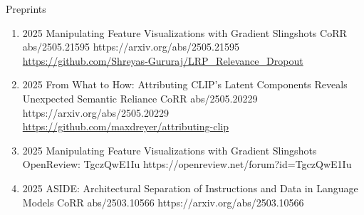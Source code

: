 \headedsubsection %
{Preprints}{}
{
    \begin{enumerate}
    
    
    
        \item {}
                        {2025}
                        {Manipulating Feature Visualizations with Gradient Slingshots}
                        {CoRR abs/2505.21595}
                        {https://arxiv.org/abs/2505.21595}
                        {
                            \\\href{https://github.com/Shreyas-Gururaj/LRP_Relevance_Dropout}{https://github.com/Shreyas-Gururaj/LRP\_Relevance\_Dropout}
                        }
                        
        \item {}
                        {2025}
                        {From What to How: Attributing CLIP's Latent Components Reveals Unexpected Semantic Reliance}
                        {CoRR abs/2505.20229}
                        {https://arxiv.org/abs/2505.20229}
                        {
                            \\\href{https://github.com/maxdreyer/attributing-clip}{https://github.com/maxdreyer/attributing-clip}
                        }
                        
    
        \item {}
                        {2025}
                        {Manipulating Feature Visualizations with Gradient Slingshots}
                        {OpenReview: TgczQwE1Iu}
                        {https://openreview.net/forum?id=TgczQwE1Iu}    
    
    
        \item {}
                        {2025}
                        {ASIDE: Architectural Separation of Instructions and Data in Language Models}
                        {CoRR abs/2503.10566}
                        {https://arxiv.org/abs/2503.10566}    


\end{enumerate}}
